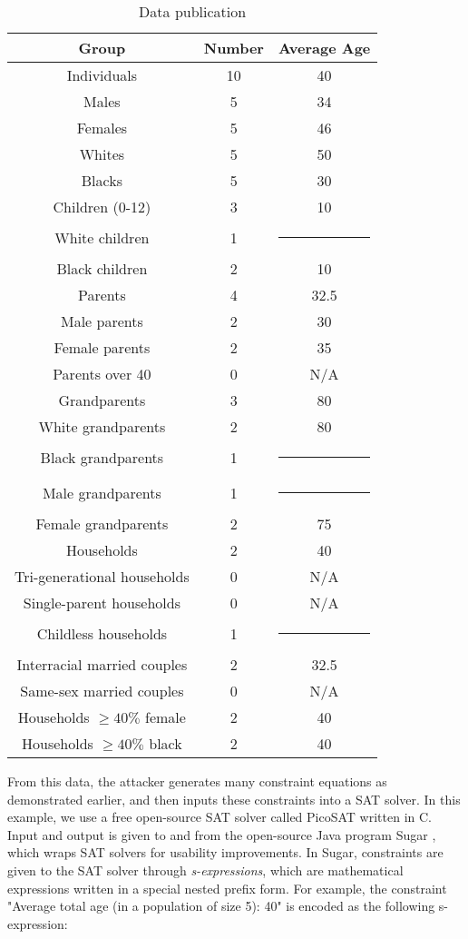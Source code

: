 \documentclass[5p,times,11pt]{elsarticle}
\begin{document}
\begin{table}[t]
\begin{tabular}{c|c|c}
Group & Number & Average Age \\
\hline
Individuals & 10 & 40 \\
Males & 5 & 34 \\
Females & 5 & 46 \\
Whites & 5 & 50 \\
Blacks & 5 & 30 \\
\hline
Children (0-12) & 3 & 10 \\
White children & 1 & \multicolumn{1}{c}{\rule{6mm}{3mm}} \\
Black children & 2 & 10 \\
\hline
Parents & 4 & 32.5 \\
Male parents & 2 & 30 \\
Female parents & 2 & 35 \\
Parents over 40 & 0 & N/A \\
\hline
Grandparents & 3 & 80 \\
White grandparents & 2 & 80 \\
Black grandparents & 1 & \multicolumn{1}{c}{\rule{6mm}{3mm}} \\
Male grandparents & 1 & \multicolumn{1}{c}{\rule{6mm}{3mm}} \\
Female grandparents & 2 & 75 \\
\hline
Households & 2 & 40 \\
Tri-generational households & 0 & N/A \\
Single-parent households & 0 & N/A \\
Childless households & 1 & \multicolumn{1}{c}{\rule{6mm}{3mm}} \\
Interracial married couples & 2 & 32.5 \\
Same-sex married couples & 0 & N/A \\
Households $\geq 40\% $ female & 2 & 40 \\
Households $\geq 40\% $ black & 2 & 40 \\

\hline
\end{tabular}
\caption{Data publication}\label{publishedstatsbig}
\end{table}

From this data, the attacker generates many constraint equations as demonstrated earlier,
and then inputs these constraints into a SAT solver. In this example, we use a free open-source SAT solver
called PicoSAT written in C. Input and output is given to and from the open-source Java program Sugar \cite{sugar}, which wraps SAT solvers for usability improvements. In Sugar, constraints are given to the SAT solver through \textit{s-expressions}, which are mathematical expressions written in a special nested prefix form. For example, the constraint "Average total age (in a population of size 5): 40" is encoded as the following s-expression:
\end{document}
